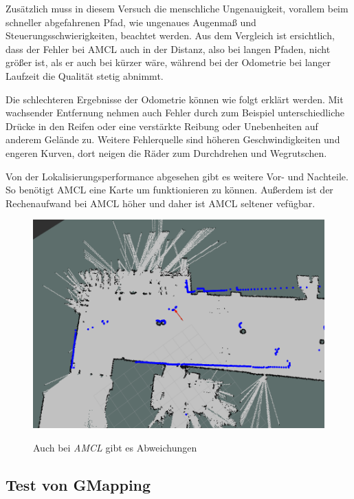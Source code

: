 \documentclass[11pt,a4paper]{article}
\begin{document}
{	 Zus\"atzlich muss in diesem Versuch die menschliche Ungenauigkeit, vorallem beim schneller abgefahrenen Pfad, wie ungenaues Augenma{\ss} und Steuerungsschwierigkeiten, beachtet werden. Aus dem Vergleich ist ersichtlich, dass der Fehler bei AMCL auch in der Distanz, also bei langen Pfaden, nicht gr\"o{\ss}er ist, als er auch bei k\"urzer w\"are, w\"ahrend bei der Odometrie bei langer Laufzeit die Qualit\"at stetig abnimmt. 

	Die schlechteren Ergebnisse der Odometrie k\"onnen wie folgt erkl\"art werden. Mit wachsender Entfernung nehmen auch Fehler durch zum Beispiel unterschiedliche Dr\"ucke in den Reifen oder eine verst\"arkte Reibung oder Unebenheiten auf anderem Gel\"ande zu. Weitere Fehlerquelle sind h\"oheren Geschwindigkeiten und engeren Kurven, dort neigen die R\"ader zum Durchdrehen und Wegrutschen. 	



	Von der Lokalisierungsperformance abgesehen gibt es weitere Vor- und Nachteile. So ben\"otigt AMCL eine Karte um funktionieren zu k\"onnen. Au{\ss}erdem ist der Rechenaufwand bei AMCL h\"oher und daher ist AMCL seltener vef\"ugbar. 


\begin{figure}[h]
	\centering
	{\includegraphics[width=\linewidth]{pictures/amcl_fail.png}}
	\caption{ Auch bei \textit{AMCL} gibt es Abweichungen \label{fig:amclFails}}
\end{figure}





\subsection{Test von GMapping}


}
\end{document}
